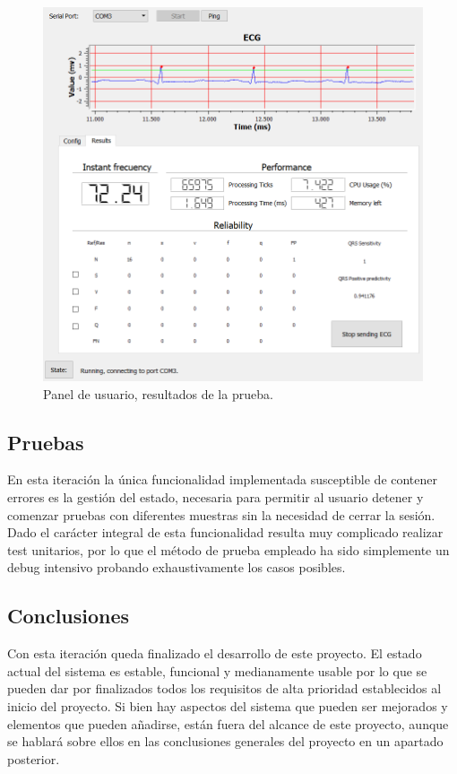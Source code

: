         \begin{figure}[H]
            \centering
                    \includegraphics[width = \linewidth]{figuras/Results.PNG}
            \caption{Panel de usuario, resultados de la prueba.}
            \label{fig:EndResults}
        \end{figure}
        
    \clearpage
    \subsection{Pruebas}
    
    En esta iteración la única funcionalidad implementada susceptible de contener errores es la gestión del estado, necesaria para permitir al usuario detener y comenzar pruebas con diferentes muestras sin la necesidad de cerrar la sesión. Dado el carácter integral de esta funcionalidad resulta muy complicado realizar test unitarios, por lo que el método de prueba empleado ha sido simplemente un debug intensivo probando exhaustivamente los casos posibles.
    
    \subsection{Conclusiones}
    
    Con esta iteración queda finalizado el desarrollo de este proyecto. El estado actual del sistema es estable, funcional y medianamente usable por lo que se pueden dar por finalizados todos los requisitos de alta prioridad establecidos al inicio del proyecto. Si bien hay aspectos del sistema que pueden ser mejorados y elementos que pueden añadirse, están fuera del alcance de este proyecto, aunque se hablará sobre ellos en las conclusiones generales del proyecto en un apartado posterior.